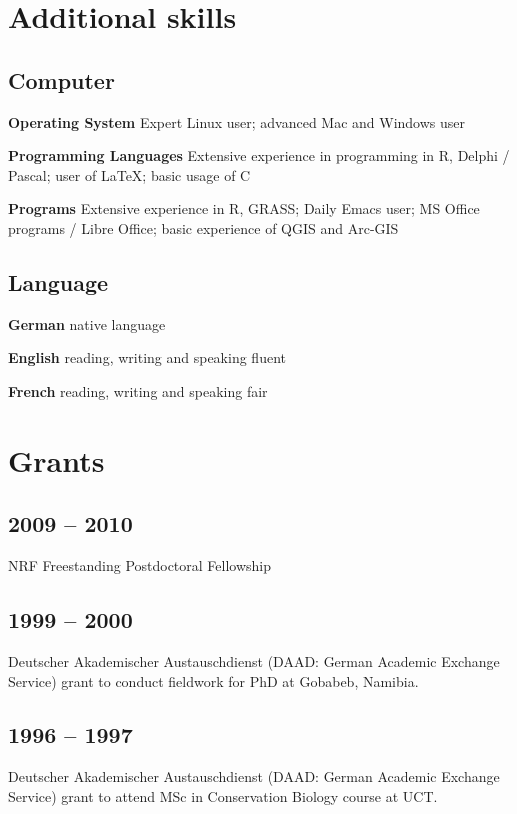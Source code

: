 \documentclass[a4paper]{article}
\begin{document}
\section{Additional skills}

\subsection{Computer}

\textbf{Operating System} Expert Linux user; advanced Mac and Windows user

\textbf{Programming Languages} Extensive experience in programming in R,
Delphi / Pascal; user of \LaTeX{}; basic usage of C

\textbf{Programs} Extensive experience in R, GRASS; Daily Emacs user; MS
Office programs / Libre Office; basic experience of QGIS and Arc-GIS

\subsection{Language}

\textbf{German} native language

\textbf{English} reading, writing and speaking fluent

\textbf{French} reading, writing and speaking fair

\section{Grants}

\subsection{2009 -- 2010}

NRF Freestanding Postdoctoral Fellowship

\subsection{1999 -- 2000}

Deutscher Akademischer Austauschdienst (DAAD: German Academic Exchange
Service) grant to conduct fieldwork for PhD at Gobabeb, Namibia.

\subsection{1996 -- 1997}

Deutscher Akademischer Austauschdienst (DAAD: German Academic Exchange
Service) grant to attend MSc in Conservation Biology course at UCT.
\end{document}

